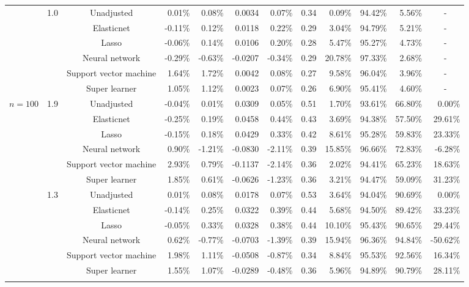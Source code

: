 \documentclass{article}
\begin{document}
\begin{center}
\begin{table}[!ht]
\begin{tabular*}{\textwidth}{@{\extracolsep\fill}c|c|c|rrrr|rrrrr}
        ~ & \multirow{6}{*}{1.0} & Unadjusted & 0.01\% & 0.08\% & 0.0034 & 0.07\% & 0.34 & 0.09\% & 94.42\% & 5.56\% & \multicolumn{1}{c}{-} \\ 
        ~ & ~ & Elasticnet & -0.11\% & 0.12\% & 0.0118 & 0.22\% & 0.29 & 3.04\% & 94.79\% & 5.21\% & \multicolumn{1}{c}{-} \\ 
        ~ & ~ & Lasso & -0.06\% & 0.14\% & 0.0106 & 0.20\% & 0.28 & 5.47\% & 95.27\% & 4.73\% & \multicolumn{1}{c}{-} \\ 
        ~ & ~ & Neural network & -0.29\% & -0.63\% & -0.0207 & -0.34\% & 0.29 & 20.78\% & 97.33\% & 2.68\% & \multicolumn{1}{c}{-} \\ 
        ~ & ~ & Support vector machine & 1.64\% & 1.72\% & 0.0042 & 0.08\% & 0.27 & 9.58\% & 96.04\% & 3.96\% & \multicolumn{1}{c}{-} \\ 
        ~ & ~ & Super learner & 1.05\% & 1.12\% & 0.0023 & 0.07\% & 0.26 & 6.90\% & 95.41\% & 4.60\% & \multicolumn{1}{c}{-} \\       \hline
        
        
         \multirow{18}{*}{$n = 100$} & \multirow{6}{*}{1.9} & Unadjusted & -0.04\% & 0.01\% & 0.0309 & 0.05\% & 0.51 & 1.70\% & 93.61\% & 66.80\% & 0.00\% \\ 
        ~ & ~ & Elasticnet & -0.25\% & 0.19\% & 0.0458 & 0.44\% & 0.43 & 3.69\% & 94.38\% & 57.50\% & 29.61\% \\ 
        ~ & ~ & Lasso & -0.15\% & 0.18\% & 0.0429 & 0.33\% & 0.42 & 8.61\% & 95.28\% & 59.83\% & 23.33\% \\ 
        ~ & ~ & Neural network & 0.90\% & -1.21\% & -0.0830 & -2.11\% & 0.39 & 15.85\% & 96.66\% & 72.83\% & -6.28\% \\ 
        ~ & ~ & Support vector machine & 2.93\% & 0.79\% & -0.1137 & -2.14\% & 0.36 & 2.02\% & 94.41\% & 65.23\% & 18.63\% \\ 
        ~ & ~ & Super learner & 1.85\% & 0.61\% & -0.0626 & -1.23\% & 0.36 & 3.21\% & 94.47\% & 59.09\% & 31.23\% \\   \cline{2-12}
        
        ~ & \multirow{6}{*}{1.3} & Unadjusted & 0.01\% & 0.08\% & 0.0178 & 0.07\% & 0.53 & 3.64\% & 94.04\% & 90.69\% & 0.00\% \\ 
        ~ & ~ & Elasticnet & -0.14\% & 0.25\% & 0.0322 & 0.39\% & 0.44 & 5.68\% & 94.50\% & 89.42\% & 33.23\% \\ 
        ~ & ~ & Lasso & -0.05\% & 0.33\% & 0.0328 & 0.38\% & 0.44 & 10.10\% & 95.43\% & 90.65\% & 29.44\% \\ 
        ~ & ~ & Neural network & 0.62\% & -0.77\% & -0.0703 & -1.39\% & 0.39 & 15.94\% & 96.36\% & 94.84\% & -50.62\% \\ 
        ~ & ~ & Support vector machine & 1.98\% & 1.11\% & -0.0508 & -0.87\% & 0.34 & 8.84\% & 95.53\% & 92.56\% & 16.34\% \\ 
        ~ & ~ & Super learner & 1.55\% & 1.07\% & -0.0289 & -0.48\% & 0.36 & 5.96\% & 94.89\% & 90.79\% & 28.11\% \\  \cline{2-12}
        

\end{tabular*}
\end{table}
\end{center}
\end{document}
